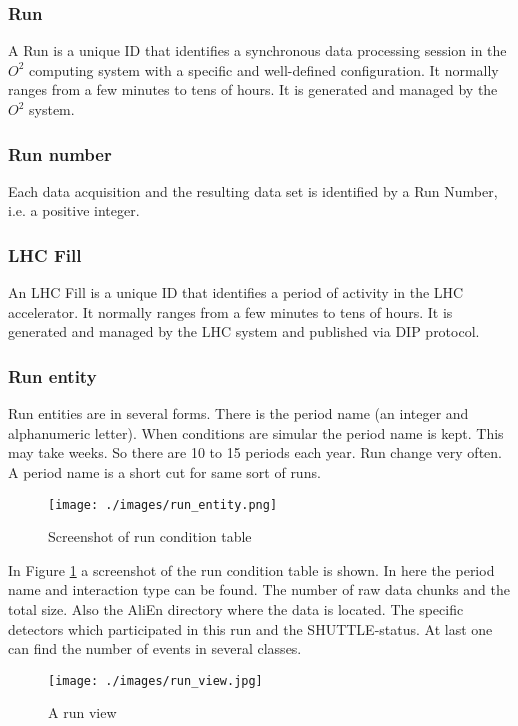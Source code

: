 \subsubsection{Run}
A Run is a unique ID that identifies a synchronous data processing session in the $O^2$ computing system with a specific and well-defined configuration. It normally ranges from a few minutes to tens of hours. It is generated and managed by the $O^2$ system. 

\subsubsection{Run number}
Each data acquisition and the resulting data set is identified by a Run Number, i.e. a positive integer.

\subsubsection{LHC Fill}
An LHC Fill is a unique ID that identifies a period of activity in the LHC accelerator. It normally ranges from a few minutes to tens of hours. It is generated and managed by the LHC system and published via DIP protocol. 

\subsubsection{Run entity}
Run entities are in several forms. There is the period name (an integer and alphanumeric letter). When conditions are simular the period name is kept. This may take weeks. So there are 10 to 15 periods each year. Run change very often. A period name is a short cut for same sort of runs.
\begin{figure}
  \begin{center}
    \texttt{[image: ./images/run\_entity.png]}
    \caption{Screenshot of run condition table}
    \label{fig:run_con_table}
  \end{center}
\end{figure}

In Figure \ref{fig:run_con_table} a screenshot of the run condition table is shown. In here the period name and interaction type can be found. The number of raw data chunks and the total size. Also the AliEn directory where the data is located. The specific detectors which participated in this run and the SHUTTLE-status. At last one can find the number of events in several classes.

\begin{figure}[h]
  \begin{center}
    \texttt{[image: ./images/run\_view.jpg]}
    \caption{A run view}
    \label{fig:run_view}
  \end{center}
\end{figure}


